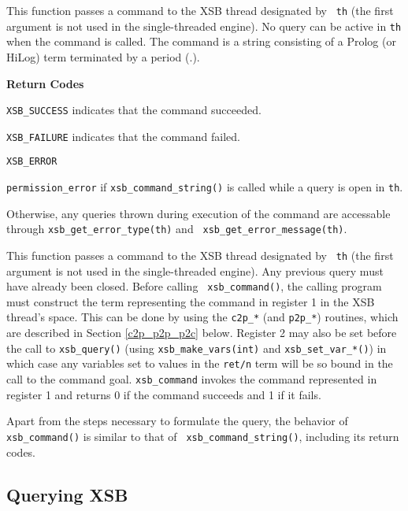 \begin{description}
 
%
This function passes a command to the XSB thread designated by {\tt
  th} (the first argument is not used in the single-threaded engine).
No query can be active in {\tt th} when the command is called.  The
command is a string consisting of a Prolog (or HiLog) term terminated
by a period (.).

{\bf Return Codes}  
\bi
\item {\tt XSB\_SUCCESS} indicates that the command succeeded.
%
\item {\tt XSB\_FAILURE} indicates that the command failed.
%
\item {\tt XSB\_ERROR} 
\bi
\item {\tt permission\_error} if {\tt xsb\_command\_string()} is
  called while a query is open in {\tt th}.
%
\item Otherwise, any queries thrown during execution of the command
  are accessable through {\tt xsb\_get\_error\_type(th)} and {\tt
    xsb\_get\_error\_message(th)}.
\ei
%
\ei

 
%
This function passes a command to the XSB thread designated by {\tt
  th} (the first argument is not used in the single-threaded engine).
Any previous query must have already been closed.  Before calling {\tt
  xsb\_command()}, the calling program must construct the term
representing the command in register 1 in the XSB thread's space.
This can be done by using the {\tt c2p\_*} (and {\tt p2p\_*})
routines, which are described in Section \ref{c2p_p2p_p2c} below.
Register 2 may also be set before the call to {\tt xsb\_query()}
(using {\tt xsb\_make\_vars(int)} and {\tt xsb\_set\_var\_*()}) in
which case any variables set to values in the {\tt ret/n} term will be
so bound in the call to the command goal.  {\tt xsb\_command} invokes
the command represented in register 1 and returns 0 if the command
succeeds and 1 if it fails.

Apart from the steps necessary to formulate the query, the behavior of
{\tt xsb\_command()} is similar to that of {\tt
  xsb\_command\_string()}, including its return codes.
\end{description}

\subsection{Querying XSB}

